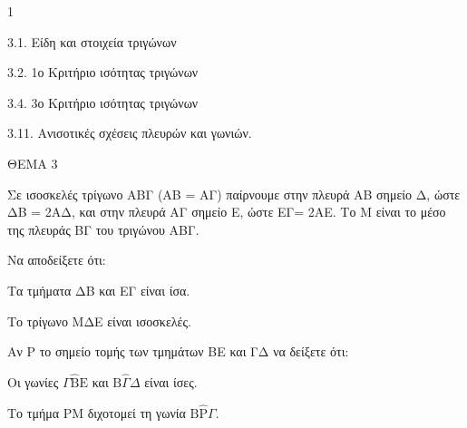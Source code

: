 \begin{ylh}{1}
    \item 3.1. Είδη και στοιχεία τριγώνων
    \item 3.2. 1ο Κριτήριο ισότητας τριγώνων
    \item 3.4. 3ο Κριτήριο ισότητας τριγώνων
    \item 3.11. Ανισοτικές σχέσεις πλευρών και γωνιών.
\end{ylh}

ΘΕΜΑ 3

Σε ισοσκελές τρίγωνο ΑΒΓ (ΑΒ = ΑΓ) παίρνουμε στην πλευρά ΑΒ σημείο Δ, ώστε ΔΒ = 2ΑΔ, και στην πλευρά ΑΓ σημείο Ε, ώστε ΕΓ= 2ΑΕ. Το Μ είναι το μέσο της πλευράς ΒΓ του τριγώνου ΑΒΓ.

\begin{alist}
\item Να αποδείξετε ότι:
    \begin{sublist}
      \item Τα τμήματα ΔΒ και ΕΓ είναι ίσα. 
      \item Το τρίγωνο ΜΔΕ είναι ισοσκελές. 
    \end{sublist}


\item Αν Ρ το σημείο τομής των τμημάτων ΒE και ΓΔ να δείξετε ότι:
    \begin{sublist}
      \item Οι γωνίες $\Gamma\widehat{\text{B}}\text{E}$ και $\text{B}\widehat{\Gamma}\Delta$ είναι ίσες. 
      \item Το τμήμα ΡΜ διχοτομεί τη γωνία $\text{B}\widehat{\text{P}}\Gamma$. 
    \end{sublist}

\end{alist}
